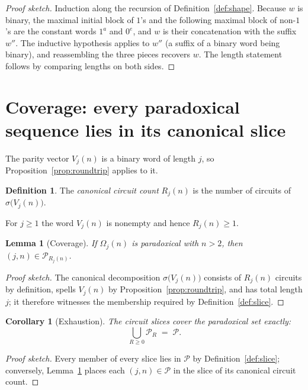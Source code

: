 \documentclass[11pt]{amsart}
\theoremstyle{plain}
\newtheorem{lemma}[theorem]{Lemma}
\newtheorem{corollary}[theorem]{Corollary}
\theoremstyle{definition}
\newtheorem{definition}[theorem]{Definition}
\theoremstyle{remark}
\newcommand{\Par}{\mathcal{P}}        %
\newcommand{\ParR}[1]{\Par_{#1}}      %
\begin{document}
\begin{proof}[Proof sketch]
Induction along the recursion of Definition~\ref{def:shape}.  Because $w$ is
binary, the maximal initial block of $1$'s and the following maximal block of
non-$1$'s are the constant words $1^{a}$ and $0^{e}$, and $w$ is their
concatenation with the suffix $w''$.  The inductive hypothesis applies to
$w''$ (a suffix of a binary word being binary), and reassembling the three
pieces recovers $w$.  The length statement follows by comparing lengths on
both sides.
\end{proof}

\section{Coverage: every paradoxical sequence lies in its canonical slice}\label{sec:coverage}

The parity vector $V_j(n)$ is a binary word of length $j$, so
Proposition~\ref{prop:roundtrip} applies to it.

\begin{definition}\label{def:circuitcount}
The \emph{canonical circuit count} $R_j(n)$ is the number of circuits of
$\sigma\bigl(V_j(n)\bigr)$.
\end{definition}

For $j\ge 1$ the word $V_j(n)$ is nonempty and hence $R_j(n)\ge 1$.

\begin{lemma}[Coverage]\label{lem:coverage}
If $\Omega_j(n)$ is paradoxical with $n>2$, then $(j,n)\in\ParR{R_j(n)}$.
\end{lemma}

\begin{proof}[Proof sketch]
The canonical decomposition $\sigma\bigl(V_j(n)\bigr)$ consists of $R_j(n)$
circuits by definition, spells $V_j(n)$ by
Proposition~\ref{prop:roundtrip}, and has total length $j$; it therefore
witnesses the membership required by Definition~\ref{def:slice}.
\end{proof}

\begin{corollary}[Exhaustion]\label{cor:exhaustion}
The circuit slices cover the paradoxical set exactly:
\[
\bigcup_{R\ge 0}\ParR{R} \;=\; \Par .
\]
\end{corollary}

\begin{proof}[Proof sketch]
Every member of every slice lies in $\Par$ by Definition~\ref{def:slice};
conversely, Lemma~\ref{lem:coverage} places each $(j,n)\in\Par$ in the slice
of its canonical circuit count.
\end{proof}
\end{document}
